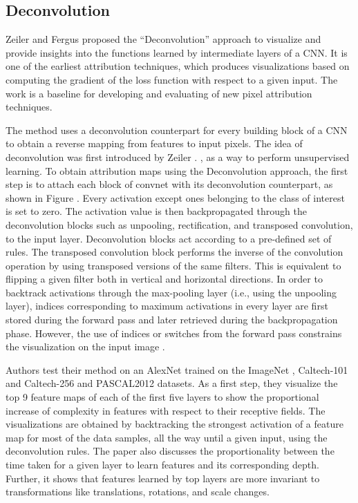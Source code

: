 \documentclass[../report.tex]{subfiles}
\begin{document}
    \subsection{Deconvolution}
    \noindent
    Zeiler and Fergus proposed the \enquote{Deconvolution}\cite{matthew2014visualizing} approach to visualize and provide insights into the functions learned by intermediate layers of a CNN. It is one of the earliest attribution techniques, which produces visualizations based on computing the gradient of the loss function with respect to a given input. The work is a baseline for developing and evaluating of new pixel attribution techniques.
    
    The method uses a deconvolution counterpart for every building block of a CNN to obtain a reverse mapping from features to input pixels. The idea of deconvolution was first introduced by Zeiler \etal. \cite{zeiler2011adaptive}, as a way to perform unsupervised learning. To obtain attribution maps using the Deconvolution approach, the first step is to attach each block of convnet with its deconvolution counterpart, as shown in Figure \cite{fig_deconv}. Every activation except ones belonging to the class of interest is set to zero. The activation value is then backpropagated through the deconvolution blocks such as unpooling, rectification, and transposed convolution, to the input layer. Deconvolution blocks act according to a pre-defined set of rules. The transposed convolution block performs the inverse of the convolution operation by using transposed versions of the same filters. This is equivalent to flipping a given filter both in vertical and horizontal directions. In order to backtrack activations through the max-pooling layer (i.e., using the unpooling layer), indices corresponding to maximum activations in every layer are first stored during the forward pass and later retrieved during the backpropagation phase. However, the use of indices or switches from the forward pass constrains the visualization on the input image \cite {guided_backprop}.
    
    Authors test their method on an AlexNet \cite{krizhevsky2012imagenet} trained on the ImageNet \cite{krizhevsky2012imagenet}, Caltech-101 \cite{caltech_101} and Caltech-256 \cite{caltech_256} and PASCAL2012 \cite{pascal-voc-2012} datasets. As a first step, they visualize the top 9 feature maps of each of the first five layers to show the proportional increase of complexity in features with respect to their receptive fields. The visualizations are obtained by backtracking the strongest activation of a feature map for most of the data samples, all the way until a given input, using the deconvolution rules. The paper also discusses the proportionality between the time taken for a given layer to learn features and its corresponding depth. Further, it shows that features learned by top layers are more invariant to transformations like translations, rotations, and scale changes.
    
\end{document}
